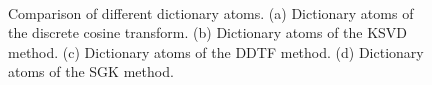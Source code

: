 \begin{figure}[htb!]
\centering
{}
   \\
\caption{Comparison of different dictionary atoms. (a) Dictionary atoms of the discrete cosine transform. (b) Dictionary atoms of the KSVD method. (c) Dictionary atoms of the DDTF method.  (d) Dictionary atoms of the SGK method. }
\label{fig:atom_dct,atom_ksvd,atom_ddtf,atom_sgk}
\end{figure}

